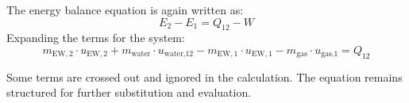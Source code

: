 The energy balance equation is again written as:  
\[
E_2 - E_1 = Q_{12} - W
\]  
Expanding the terms for the system:  
\[
m_{\text{EW},2} \cdot u_{\text{EW},2} + m_{\text{water}} \cdot u_{\text{water,12}} - m_{\text{EW},1} \cdot u_{\text{EW},1} - m_{\text{gas}} \cdot u_{\text{gas,1}} = Q_{12}
\]  

Some terms are crossed out and ignored in the calculation. The equation remains structured for further substitution and evaluation.